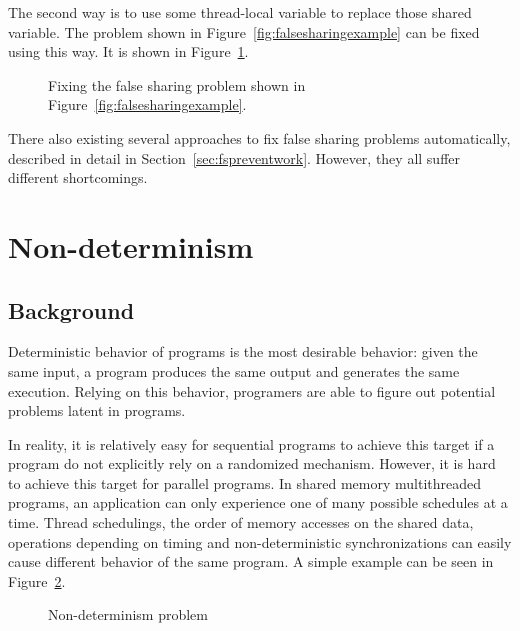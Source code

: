 The second way is to use some thread-local variable to replace those shared variable.
The problem shown in Figure~\ref{fig:falsesharingexample} can be fixed using this way. It is shown in Figure~\ref{fig:falsesharingexamplefix}. 

\begin{figure}[!ht]
{\centering
\fbox{
\subfigure{}
}
\caption{Fixing the false sharing problem shown in Figure~\ref{fig:falsesharingexample}.
\label{fig:falsesharingexamplefix}}
}
\end{figure}

There also existing several approaches to fix false sharing problems automatically, described in detail in Section~\ref{sec:fspreventwork}. However, they all suffer different shortcomings. 




\section{Non-determinism}

\subsection{Background}
Deterministic behavior of programs is the most desirable behavior: given the same input, a program
produces the same output and generates the same execution. Relying on this behavior, programers
are able to figure out potential problems latent in programs. 

In reality, it is relatively easy for sequential programs to achieve this target 
if a program do not explicitly rely on a randomized mechanism. 
However, it is hard to achieve this target for parallel programs.
In shared memory multithreaded programs, an application can only experience one of many possible 
schedules at a time. 
Thread schedulings, the order of memory accesses on the shared data, 
operations depending on timing and non-deterministic synchronizations 
can easily cause different behavior of the same program.
A simple example can be seen in Figure~\ref{fig:nondeterminism}.

\begin{figure}[!ht]
{\centering
\fbox{
\subfigure{}
\hspace{12pt}
\subfigure{}
\hspace{12pt}
\subfigure{}
}
\caption{Non-determinism problem 
\label{fig:nondeterminism}}
}
\end{figure}

